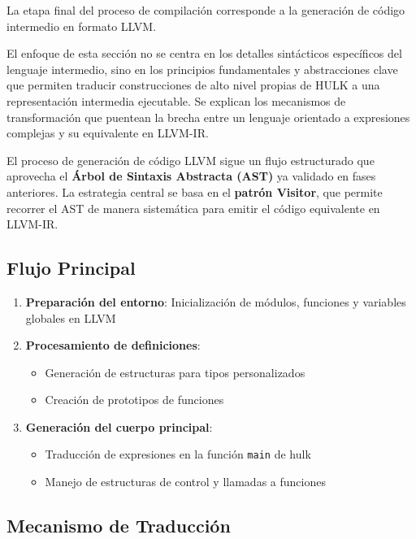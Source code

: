 \documentclass{article}
\begin{document}
La etapa final del proceso de compilación corresponde a la generación de código intermedio en formato LLVM. 

El enfoque de esta sección no se centra en los detalles sintácticos específicos del lenguaje intermedio, 
sino en los principios fundamentales y abstracciones clave que permiten traducir construcciones de alto 
nivel propias de HULK a una representación intermedia ejecutable. Se explican los mecanismos de transformación 
que puentean la brecha entre un lenguaje orientado a expresiones complejas y su equivalente en LLVM-IR.

El proceso de generación de código LLVM sigue un flujo estructurado que aprovecha el \textbf{Árbol de Sintaxis Abstracta (AST)} ya validado en fases anteriores. La estrategia central se basa en el \textbf{patrón Visitor}, que permite recorrer el AST de manera sistemática para emitir el código equivalente en LLVM-IR.

\subsection*{Flujo Principal}
\begin{enumerate}
    \item \textbf{Preparación del entorno}: Inicialización de módulos, funciones y variables globales en LLVM
    
    \item \textbf{Procesamiento de definiciones}:
    \begin{itemize}
        \item Generación de estructuras para tipos personalizados
        \item Creación de prototipos de funciones
    \end{itemize}
    
    \item \textbf{Generación del cuerpo principal}:
    \begin{itemize}
        \item Traducción de expresiones en la función \texttt{main} de hulk
        \item Manejo de estructuras de control y llamadas a funciones
    \end{itemize}
\end{enumerate}

\subsection*{Mecanismo de Traducción}
\end{document}

